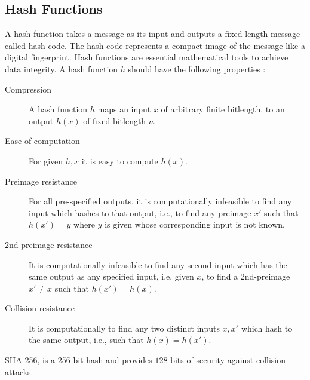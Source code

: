 \documentclass[%
  slidesonly,%
  semlayer%
  ]{seminar}                                  %
\begin{document}
\begin{slide}
  \subsection*{Hash Functions}
    A hash function takes a message as its input and outputs a fixed length message called hash code.
    The hash code represents a compact image of the message like a digital fingerprint.
    Hash functions are essential mathematical tools to achieve data integrity.
    A hash function $h$ should have the following properties :
    \begin{description}
      \item [Compression] A hash function $h$ maps an input $x$ of arbitrary finite bitlength, to an output $h(x)$ of fixed bitlength $n$.
      \item [Ease of computation] For given $h,x$ it is easy to compute $h(x)$.
      \item [Preimage resistance] For all pre-specified outputs, it is computationally infeasible to find any input which hashes to that output, i.e., to find any preimage $x'$ such that $h(x') = y$ where $y$ is given whose corresponding input is not known.
      \item [2nd-preimage resistance] It is computationally infeasible to find any second input which has the same output as any specified input, i.e, given $x$, to find a 2nd-preimage $x' \neq x$ such that $h(x') = h(x)$.
      \item [Collision resistance] It is computationally to find any two distinct inputs $x,x'$ which hash to the same output, i.e., such that $h(x) = h(x')$.
    \end{description}
    SHA-256, is a 256-bit hash and provides $128$ bits of security against collision attacks.

    \clearpage


\end{slide}
\end{document}
